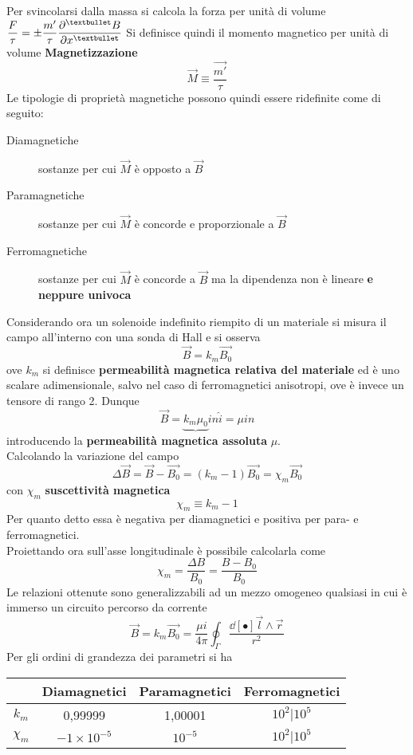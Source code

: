 Per svincolarsi dalla massa si calcola la forza per unità di volume $\ds \frac{F}{\tau} = \pm \frac{m'}{\tau} \pdv[•]{B}{x}$
Si definisce quindi il momento magnetico per unità di volume \textbf{Magnetizzazione}
\[\vec{M} \equiv \frac{\vec{m'}}{\tau}\]
Le tipologie di proprietà magnetiche possono quindi essere ridefinite come di seguito:
\begin{description}
\item[Diamagnetiche] sostanze per cui $\vec{M}$ è opposto a $\vec{B}$
\item[Paramagnetiche] sostanze per cui $\vec{M}$ è concorde e proporzionale a $\vec{B}$
\item[Ferromagnetiche] sostanze per cui $\vec{M}$ è concorde a $\vec{B}$ ma la dipendenza non è lineare \textbf{e neppure univoca}
\end{description}
Considerando ora un solenoide indefinito riempito di un materiale si misura il campo all'interno con una sonda di Hall e si osserva
\[\vec{B} = k_m \vec{B_0}\]
ove $k_m$ si definisce \textbf{permeabilità magnetica relativa del materiale} ed è uno scalare adimensionale, salvo nel caso di ferromagnetici anisotropi, ove è invece un tensore di rango 2. Dunque
\[\vec{B} = \underbrace{k_m \mu_0} i n \hat{i} = \mu i n\]
introducendo la \textbf{permeabilità magnetica assoluta} $\mu$.
\\Calcolando la variazione del campo
\[\Delta \vec{B} = \vec{B} - \vec{B_0} = (k_m - 1) \vec{B_0} = \chi_m \vec{B_0}\]
con $\chi_m$ \textbf{suscettività magnetica} 
\[\chi_m \equiv k_m - 1\]
Per quanto detto essa è negativa per diamagnetici e positiva per para- e ferromagnetici.
\\Proiettando ora sull'asse longitudinale è possibile calcolarla come
\[\chi_m = \frac{\Delta B}{B_0} = \frac{B - B_0}{B_0}\]
Le relazioni ottenute sono generalizzabili ad un mezzo omogeneo qualsiasi in cui è immerso un circuito percorso da corrente
\[\vec{B} = k_m \vec{B_0} = \frac{\mu i}{4 \pi} \oint_\Gamma \frac{\dd[•]{\vec{l}} \wedge \vec{r}}{r^2}\]
Per gli ordini di grandezza dei parametri si ha

\begin{table}
\centering
\begin{tabular}{c|ccc}
& Diamagnetici & Paramagnetici & Ferromagnetici \\\hline
$k_m$ & 0,99999 & 1,00001 & $10^{2} | 10^{5}$\\
$\chi_m$ & $-1 \times 10^{-5}$ & $10^{-5}$ & $10^{2} | 10^{5}$
\end{tabular}
\end{table}

